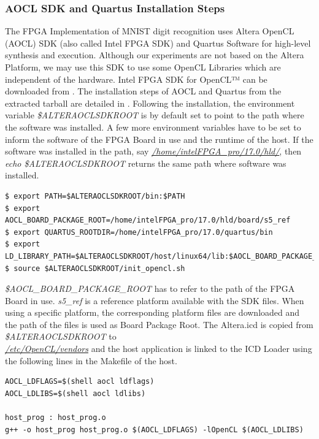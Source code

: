 \subsubsection*{AOCL SDK and Quartus Installation Steps}
The FPGA Implementation of MNIST digit recognition \cite{mnist-altera-opencl} uses Altera OpenCL (AOCL) SDK (also called Intel FPGA SDK) and Quartus Software for high-level synthesis and execution. Although our experiments are not based on the Altera Platform, we may use this SDK to use some OpenCL Libraries which are independent of the hardware.\newline \newline
Intel FPGA SDK for OpenCL™ can be downloaded from \cite{opencl_fpga_sdk}. The installation steps of AOCL and Quartus from the extracted tarball are detailed in \cite{intel_fpga_guide}. Following the installation, the environment variable \textit{\$ALTERAOCLSDKROOT} is by default set to point to the path where the software was installed. A few more environment variables have to be set to inform the software of the FPGA Board in use and the runtime of the host. If the software was installed in the path, say \underline{\textit{/home/intelFPGA\_pro/17.0/hld/}}, then \textit{echo \$ALTERAOCLSDKROOT} returns the same path where software was installed. 
\begin{scriptsize}
\linuxbash
\begin{lstlisting}
$ export PATH=$ALTERAOCLSDKROOT/bin:$PATH
$ export AOCL_BOARD_PACKAGE_ROOT=/home/intelFPGA_pro/17.0/hld/board/s5_ref
$ export QUARTUS_ROOTDIR=/home/intelFPGA_pro/17.0/quartus/bin
$ export LD_LIBRARY_PATH=$ALTERAOCLSDKROOT/host/linux64/lib:$AOCL_BOARD_PACKAGE_ROOT/linux64/lib:/usr/local/lib:$LD_LIBRARY_PATH
$ source $ALTERAOCLSDKROOT/init_opencl.sh
\end{lstlisting}
\end{scriptsize}
\textit{\$AOCL\_BOARD\_PACKAGE\_ROOT} has to refer to the path of the FPGA Board in use. \textit{s5\_ref} is a reference platform available with the SDK files. When using a specific platform, the corresponding platform files are downloaded and the path of the files is used as Board Package Root. \newline \newline
The Altera.icd is copied from \textit{\$ALTERAOCLSDKROOT} to\\ \underline{\textit{/etc/OpenCL/vendors}} and the host application is linked to the ICD Loader using the following lines in the Makefile of the host.
\begin{scriptsize}
\linuxbash
\begin{lstlisting}
AOCL_LDFLAGS=$(shell aocl ldflags)
AOCL_LDLIBS=$(shell aocl ldlibs)

host_prog : host_prog.o
g++ -o host_prog host_prog.o $(AOCL_LDFLAGS) -lOpenCL $(AOCL_LDLIBS)
\end{lstlisting}
\end{scriptsize}

